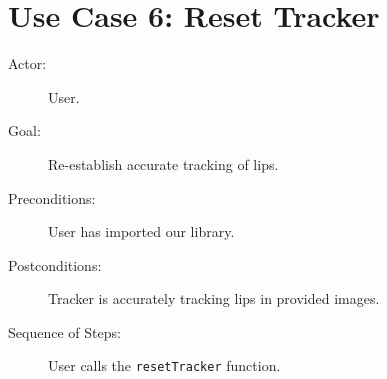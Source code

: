 \section{Use Case 6: Reset Tracker}

\begin{description}
	\item[Actor:] User.
	\item[Goal:] Re-establish accurate tracking of lips.
	\item[Preconditions:] User has imported our library.
	\item[Postconditions:] Tracker is accurately tracking lips in provided images.
	\item[Sequence of Steps:] User calls the \texttt{resetTracker} function.
\end{description}